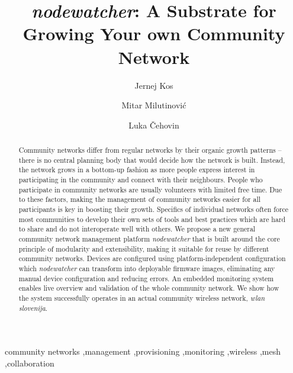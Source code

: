 \documentclass[5p,sort&compress]{elsarticle}
\newcommand{\nodewatcher}{\textit{nodewatcher}}
\newcommand{\wlanslovenija}{\textit{wlan slovenija}}
\begin{document}
\begin{frontmatter}
\title{\nodewatcher{}: A Substrate for Growing Your own Community Network}

\author[fri,wlansi]{Jernej Kos}

\author[berkeley,wlansi]{Mitar Milutinović}

\author[fri,wlansi]{Luka Čehovin}


\address[fri]{University of Ljubljana, Faculty of Computer and Information Science, Ljubljana, Slovenia}

\address[berkeley]{University of California, Berkeley, USA}

\address[wlansi]{\wlanslovenija{}, Open wireless network of Slovenia, \url{https://wlan-si.net}}

\begin{abstract}
Community networks differ from regular networks by their organic growth patterns -- there is no central planning body that would decide how the network is built.
Instead, the network grows in a bottom-up fashion as more people express interest in participating in the community and connect with their neighbours.
People who participate in community networks are usually volunteers with limited free time.
Due to these factors, making the management of community networks easier for all participants is key in boosting their growth.
Specifics of individual networks often force most communities to develop their own sets of tools and best practices which are hard to share and do not interoperate well with others.
We propose a new general community network management platform \nodewatcher{} that is built around the core principle of modularity and extensibility, making it suitable for reuse by different community networks.
Devices are configured using platform-independent configuration which \nodewatcher{} can transform into deployable firmware images, eliminating any manual device configuration and reducing errors.
An embedded monitoring system enables live overview and validation of the whole community network.
We show how the system successfully operates in an actual community wireless network, \wlanslovenija{}.
\end{abstract}

\begin{keyword}
community networks \sep management \sep provisioning \sep monitoring \sep wireless \sep mesh \sep collaboration
\end{keyword}
\end{frontmatter}
\end{document}
